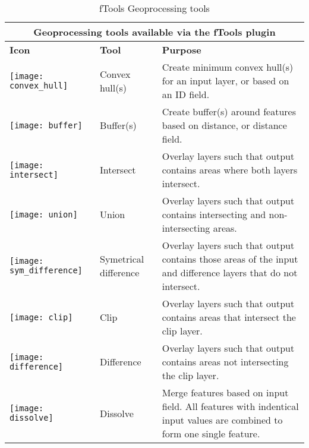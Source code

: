 \begin{table}[ht]
\centering
 \begin{tabular}{|m{1cm}|m{3cm}|m{9cm}|}
 \hline \multicolumn{3}{|c|}{\textbf{Geoprocessing tools available via the fTools plugin}} \\
 \hline \textbf{Icon} & \textbf{Tool} & \textbf{Purpose} \\
 \hline \texttt{[image: convex\_hull]} & Convex hull(s) & Create 
minimum convex hull(s) for an input layer, or based on an ID field. \\
 \hline \texttt{[image: buffer]} & Buffer(s) & Create 
buffer(s) around features based on distance, or distance field. \\
 \hline \texttt{[image: intersect]} & Intersect & Overlay 
layers such that output contains areas where both layers intersect. \\
 \hline \texttt{[image: union]} & Union & Overlay layers such 
that output contains intersecting and non-intersecting areas. \\
 \hline \texttt{[image: sym\_difference]} & Symetrical difference & 
Overlay layers such that output contains those areas of the input and 
difference layers that do not intersect. \\
 \hline \texttt{[image: clip]} & Clip & Overlay layers such 
that output contains areas that intersect the clip layer. \\
 \hline \texttt{[image: difference]} & Difference & Overlay layers 
such that output contains areas not intersecting the clip layer. \\
 \hline \texttt{[image: dissolve]} & Dissolve & Merge features 
based on input field. All features with indentical input values are combined 
to form one single feature. \\
 \hline
\end{tabular}
\caption{fTools Geoprocessing tools}\label{tab:ftool_geoprocessing}
\end{table}

